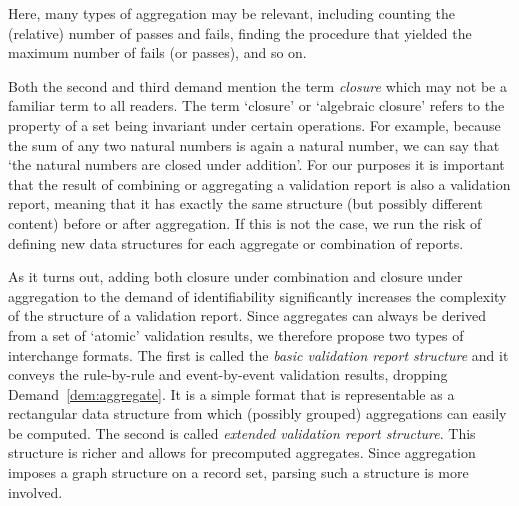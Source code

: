 Here, many types of aggregation may be relevant, including counting the
(relative) number of passes and fails, finding the procedure that yielded the
maximum number of fails (or passes), and so on.

Both the second and third demand mention the term \emph{closure} which may not be a
familiar term to all readers. The term `closure' or `algebraic closure' refers
to the property of a set being invariant under certain operations. For example,
because the sum of any two natural numbers is again a natural number, we can say
that ‘the natural numbers are closed under addition’. For our purposes it is
important that the result of combining or aggregating a validation report is
also a validation report, meaning that it has exactly the same structure (but
possibly different content) before or after aggregation. If this is not the
case, we run the risk of defining new data structures for each aggregate or
combination of reports.

As it turns out, adding both closure under combination and closure under
aggregation to the demand of identifiability significantly increases the
complexity of the structure of a validation report. Since aggregates can always
be derived from a set of `atomic' validation results, we therefore propose two
types of interchange formats. The first is called the \emph{basic validation
report structure} and it conveys the rule-by-rule and event-by-event validation
results, dropping Demand~\ref{dem:aggregate}. It is a simple format that is
representable as a rectangular data structure from which (possibly grouped)
aggregations can easily be computed.  The second is called \emph{extended
validation report structure}. This structure is richer and allows for
precomputed aggregates.  Since aggregation imposes a graph structure on a
record set, parsing such a structure is more involved.



